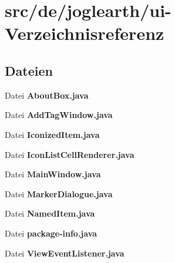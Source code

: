 \section{src/de/joglearth/ui-\/\-Verzeichnisreferenz}
\label{dir_5745dd8124ede4e7f54a3424e82f2584}
\subsection*{Dateien}
\begin{DoxyCompactItemize}
\item 
Datei {\bfseries About\-Box.\-java}
\item 
Datei {\bfseries Add\-Tag\-Window.\-java}
\item 
Datei {\bfseries Iconized\-Item.\-java}
\item 
Datei {\bfseries Icon\-List\-Cell\-Renderer.\-java}
\item 
Datei {\bfseries Main\-Window.\-java}
\item 
Datei {\bfseries Marker\-Dialogue.\-java}
\item 
Datei {\bfseries Named\-Item.\-java}
\item 
Datei {\bfseries package-\/info.\-java}
\item 
Datei {\bfseries View\-Event\-Listener.\-java}
\end{DoxyCompactItemize}
